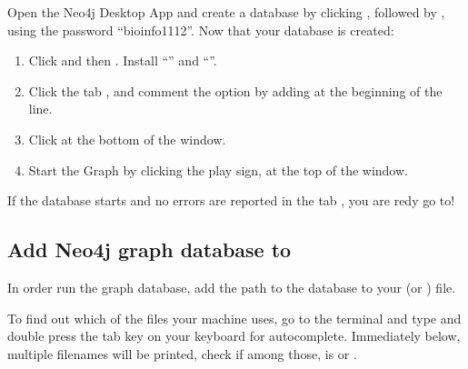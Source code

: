 \documentclass[letterpaper,10pt,english]{sphinxmanual}
\begin{document}
\noindent{}

\noindent{}

\noindent{}

Open the Neo4j Desktop App and create a database by clicking , followed by , using the password “bioinfo1112”.
Now that your database is created:

\noindent{}

\noindent{}

\noindent{}
\begin{enumerate}
%
\item {} 
Click  and then . Install “” and “”.

\item {} 
Click the tab , and comment the option  by adding \sphinxcode{\sphinxupquote{\#}} at the beginning of the line.

\item {} 
Click  at the bottom of the window.

\item {} 
Start the Graph by clicking the play sign, at the top of the window.

\end{enumerate}

If the database starts and no errors are reported in the tab , you are redy go to!


\subsection{Add Neo4j graph database to }
\label{\detokenize{intro/getting-started-with-neo4j:add-neo4j-graph-database-to-bashrc}}
In order run the graph database, add the path to the database to your  (or ) file.

To find out which of the files your machine uses, go to the terminal and type  and double press the tab key on your keyboard for auto\sphinxhyphen{}complete.
Immediately below, multiple filenames will be printed, check if among those, is  or .
\end{document}
